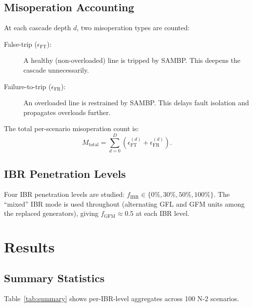 \documentclass[11pt,a4paper]{article}
\begin{document}
\subsection{Misoperation Accounting}

At each cascade depth $d$, two misoperation types are counted:

\begin{description}
  \item[False-trip ($\epsilon_\text{FT}$):] A healthy (non-overloaded) line
    is tripped by SAMBP.  This deepens the cascade unnecessarily.
  \item[Failure-to-trip ($\epsilon_\text{FR}$):] An overloaded line is
    restrained by SAMBP.  This delays fault isolation and propagates
    overloads further.
\end{description}

The total per-scenario misoperation count is:
\begin{equation}
  M_\text{total} = \sum_{d=0}^{D} \left(\epsilon_\text{FT}^{(d)} +
  \epsilon_\text{FR}^{(d)}\right).
\end{equation}

\subsection{IBR Penetration Levels}

Four IBR penetration levels are studied:
$f_\text{IBR} \in \{0\%, 30\%, 50\%, 100\%\}$.  The ``mixed'' IBR mode
is used throughout (alternating GFL and GFM units among the replaced
generators), giving $f_\text{GFM} \approx 0.5$ at each IBR level.

\section{Results}

\subsection{Summary Statistics}

Table~\ref{tab:summary} shows per-IBR-level aggregates across 100 N-2
scenarios.
\end{document}
